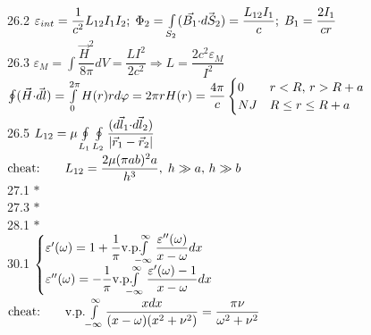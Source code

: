 \num{26.2}
$\varepsilon_{int}=\dfrac1{c^2}L_{12}I_1 I_2;\;\Phi_2 = \int\limits_{S_2}(\vec{B_1}{\cdot}\vec{dS_2})=\dfrac{L_{12}I_1}{c};\;B_1=\dfrac{2I_1}{cr}$\\

\num{26.3}
$\varepsilon_M=\int\dfrac{\vec{H}^2}{8\pi}dV=\dfrac{LI^2}{2c^2} \Rightarrow L=\dfrac{2c^2\varepsilon_M}{I^2}$\\
$\oint(\vec{H}{\cdot}\vec{dl})=\int\limits_0^{2\pi}H(r)rd\varphi=2\pi rH(r)=\dfrac{4\pi}{c}
\begin{cases} 0 & r<R,\,r>R+a\\ NJ & R\le r\le R+a \end{cases}$\\

\num{26.5}
$L_{12}=\mu\oint\limits_{L_1}\oint\limits_{L_2}\dfrac{(\vec{dl_1}{\cdot}\vec{dl_2})}{\left| \vec{r}_1-\vec{r}_2 \right|}$\\
$\text{cheat:\qquad}L_{12}=\dfrac{2\mu(\pi ab)^2 a}{h^3},\;h\gg a,\,h\gg b$\\

\num{27.1}
$* $\\

\num{27.3}
$* $\\

\num{28.1}
$* $\\

\num{30.1}
$\begin{cases}
\varepsilon'(\omega)=1+\dfrac1{\pi} \text{v.p.\!\!\!\!}\int\limits_{-\infty}^\infty \dfrac{\varepsilon''(\omega)}{x-\omega}dx\\
\varepsilon''(\omega)=-\dfrac1{\pi} \text{v.p.\!\!\!\!}\int\limits_{-\infty}^\infty \dfrac{\varepsilon'(\omega)-1}{x-\omega}dx
\end{cases}$\\
$\text{cheat:\qquad v.p.\!}\int\limits_{-\infty}^\infty \dfrac{xdx}{(x-\omega)(x^2+\nu^2)} = \dfrac{\pi\nu}{\omega^2+\nu^2}$\\




